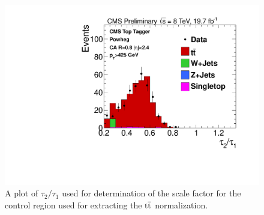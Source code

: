 \begin{figure}[htcb]
\centering
\includegraphics[width=1.0\textwidth]{AN-14-049/figs/semiLepMassbstar_t1Tau21_POWHEG_TTWeight.pdf}
\caption{A plot of $\tau_2/\tau_1$ used for determination of the scale factor for the control region used for extracting the $\mathrm{t\overline{t}}$ normalization. }
\label{figs:bsNsubCRSF}
\end{figure}



